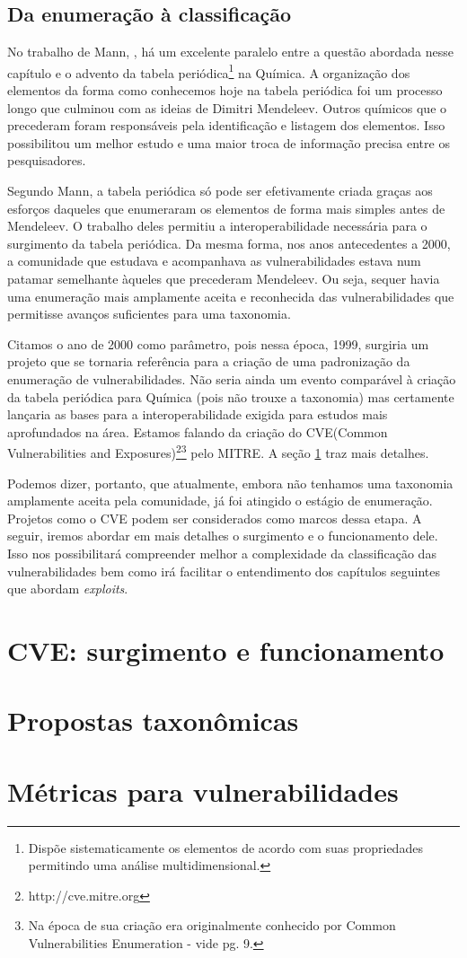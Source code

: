 		\subsection{Da enumeração à classificação}
			No trabalho de Mann, \cite{Mann1999}, há um excelente paralelo entre a
			questão abordada nesse capítulo e o advento da tabela 
			periódica\footnote{Dispõe sistematicamente os elementos de acordo com suas propriedades permitindo
			uma análise multidimensional.} na Química. 
			A organização dos elementos da forma como conhecemos hoje na tabela periódica
			foi um processo longo que culminou com as ideias de Dimitri Mendeleev.
			Outros químicos que o precederam foram responsáveis pela identificação e
			listagem dos elementos. Isso possibilitou um melhor estudo e uma maior
			troca de informação precisa entre os pesquisadores.


			Segundo Mann, a tabela periódica só pode ser efetivamente criada graças
			aos esforços daqueles que enumeraram os elementos de forma mais simples
			antes de Mendeleev. O trabalho deles permitiu a interoperabilidade
			necessária para o surgimento da tabela periódica.
			Da mesma forma, nos anos antecedentes a 2000, a comunidade que estudava
			e acompanhava as vulnerabilidades estava num patamar semelhante àqueles
			que precederam Mendeleev. Ou seja, sequer havia uma enumeração mais
			amplamente aceita e reconhecida das vulnerabilidades que permitisse
			avanços suficientes para uma taxonomia.

			
			Citamos o ano de 2000 como parâmetro, pois nessa época, 1999, surgiria um projeto
			que se tornaria referência para a criação de uma padronização da enumeração
			de vulnerabilidades. Não seria ainda um evento comparável à criação da
			tabela periódica para Química (pois não trouxe a taxonomia) 
			mas certamente lançaria as bases para
			a interoperabilidade exigida para estudos mais aprofundados na área.
			Estamos falando da criação do 
			CVE(Common Vulnerabilities and Exposures)\footnote{http://cve.mitre.org}\footnote{Na época
			de sua criação era originalmente conhecido por Common Vulnerabilities Enumeration - vide
			\cite{Meunier2006} pg. 9.}
			pelo MITRE. A seção \ref{sec:cve} traz mais detalhes.


			Podemos dizer, portanto, que atualmente, embora não tenhamos uma taxonomia
			amplamente aceita pela comunidade, já foi atingido o estágio de enumeração.
			Projetos como o CVE podem ser considerados como marcos dessa etapa.
			A seguir, iremos abordar em mais detalhes o surgimento e o funcionamento dele.
			Isso nos possibilitará compreender melhor a complexidade da classificação
			das vulnerabilidades bem como irá facilitar o entendimento dos capítulos
			seguintes que abordam \textsl{exploits}.
			

	\section{CVE: surgimento e funcionamento}
	\label{sec:cve}
		
	\section{Propostas taxonômicas}

	\section{Métricas para vulnerabilidades}

